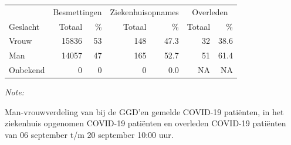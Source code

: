 \documentclass[
  english,
  man,floatsintext]{apa6}
\begin{document}
\begin{table}
\centering\begingroup\fontsize{11}{13}\selectfont

\begin{threeparttable}
\begin{tabular}{lrrrrrr}
\toprule
\multicolumn{1}{c}{ } & \multicolumn{2}{c}{Besmettingen} & \multicolumn{2}{c}{Ziekenhuisopnames} & \multicolumn{2}{c}{Overleden} \\
\cmidrule(l{3pt}r{3pt}){2-3} \cmidrule(l{3pt}r{3pt}){4-5} \cmidrule(l{3pt}r{3pt}){6-7}
Geslacht & Totaal & \% & Totaal & \% & Totaal & \%\\
\midrule
Vrouw & 15836 & 53 & 148 & 47.3 & 32 & 38.6\\
Man & 14057 & 47 & 165 & 52.7 & 51 & 61.4\\
Onbekend & 0 & 0 & 0 & 0.0 & NA & NA\\
\bottomrule
\end{tabular}
\begin{tablenotes}
\item \textit{Note: } 
\item Man-vrouwverdeling van bij de GGD’en gemelde COVID-19 patiënten, in het ziekenhuis opgenomen COVID-19 patiënten en overleden COVID-19 patiënten van 06 september t/m 20 september 10:00 uur.
\end{tablenotes}
\end{threeparttable}
\endgroup{}
\end{table}
\newpage
\end{document}
